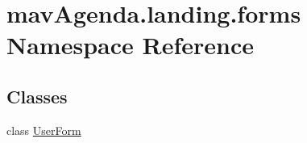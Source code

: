\hypertarget{namespacemavAgenda_1_1landing_1_1forms}{}\section{mav\+Agenda.\+landing.\+forms Namespace Reference}
\label{namespacemavAgenda_1_1landing_1_1forms}
\subsection*{Classes}
\begin{DoxyCompactItemize}
\item 
class \mbox{\hyperlink{classmavAgenda_1_1landing_1_1forms_1_1UserForm}{User\+Form}}
\end{DoxyCompactItemize}
